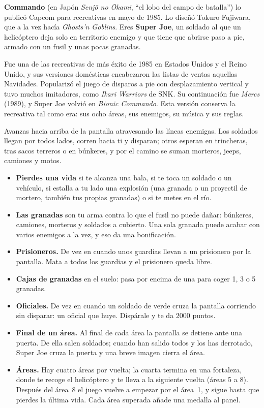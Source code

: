 
\textbf{Commando} (en Japón \textit{Senj\=o no \=Okami}, ``el lobo del campo de batalla'') lo publicó Capcom para recreativas en
mayo de 1985. Lo diseñó Tokuro Fujiwara, que a la vez hacía \textit{Ghosts'n Goblins}. Eres \textbf{Super Joe}, un soldado
al que un helicóptero deja solo en territorio enemigo y que tiene que abrirse paso a pie, armado con un fusil y unas pocas
granadas.

Fue una de las recreativas de más éxito de 1985 en Estados Unidos y el Reino Unido, y sus versiones domésticas encabezaron
las listas de ventas aquellas Navidades. Popularizó el juego de disparos a pie con desplazamiento vertical y tuvo muchos
imitadores, como \textit{Ikari Warriors} de SNK. Su continuación fue \textit{Mercs} (1989), y Super Joe volvió en
\textit{Bionic Commando}. Esta versión conserva la recreativa tal como era: sus ocho áreas, sus enemigos, su música y sus
reglas.


Avanzas hacia arriba de la pantalla atravesando las líneas enemigas. Los soldados llegan por todos lados, corren hacia ti y
disparan; otros esperan en trincheras, tras sacos terreros o en búnkeres, y por el camino se suman morteros, jeeps, camiones
y motos.

\begin{itemize}
\item \textbf{Pierdes una vida} si te alcanza una bala, si te toca un soldado o un vehículo, si estalla a tu lado una
explosión (una granada o un proyectil de mortero, también tus propias granadas) o si te metes en el río.
\item \textbf{Las granadas} son tu arma contra lo que el fusil no puede dañar: búnkeres, camiones, morteros y soldados a
cubierto. Una sola granada puede acabar con varios enemigos a la vez, y eso da una bonificación.
\item \textbf{Prisioneros.} De vez en cuando unos guardias llevan a un prisionero por la pantalla. Mata a todos los guardias y
el prisionero queda libre.
\item \textbf{Cajas de granadas} en el suelo: pasa por encima de una para coger 1, 3 o 5 granadas.
\item \textbf{Oficiales.} De vez en cuando un soldado de verde cruza la pantalla corriendo sin disparar: un oficial que huye.
Dispárale y te da 2000 puntos.
\item \textbf{Final de un área.} Al final de cada área la pantalla se detiene ante una puerta. De ella salen soldados; cuando
han salido todos y los has derrotado, Super Joe cruza la puerta y una breve imagen cierra el área.
\item \textbf{Áreas.} Hay cuatro áreas por vuelta; la cuarta termina en una fortaleza, donde te recoge el helicóptero y te
lleva a la siguiente vuelta (áreas 5 a 8). Después del área~8 el juego vuelve a empezar por el área~1, y sigue hasta que
pierdes la última vida. Cada área superada añade una medalla al panel.
\end{itemize}

